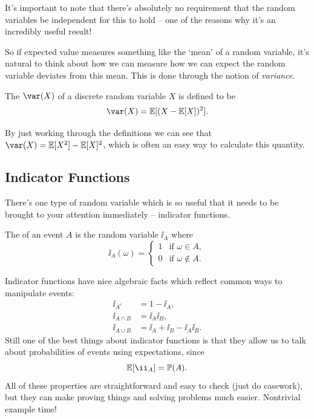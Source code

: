 \documentclass[a4paper]{scrartcl}
\begin{document}
It's important to note that there's absolutely no requirement that the random variables be independent for this to hold -- one of the reasons why it's an incredibly useful result!

So if expected value measures something like the `mean' of a random variable, it's natural to think about how we can measure how we can expect the random variable deviates from this mean. This is done through the notion of \emph{variance}.

\begin{definition}[Variance]
	The  $\var(X)$ of a discrete random variable $X$ is defined to be
	$$
\var(X) = \EE[(X - \EE[X])^2].
	$$
\end{definition}

By just working through the definitions we can see that $\var(X) = \EE[X^2] - \EE[X]^2$, which is often an easy way to calculate this quantity.

\subsection{Indicator Functions}

There's one type of random variable which is so useful that it needs to be brought to your attention immediately -- indicator functions.

\begin{definition}
	The  of an event $A$ is the random variable $\ii_A$ where
	$$
\ii_A(\omega) = \begin{cases}
	1 &\mbox{if } \omega  \in A, \\
	0 &\mbox{if } \omega  \not \in A.
   \end{cases}
	$$
\end{definition}

Indicator functions have nice algebraic facts which reflect common ways to manipulate events:
\begin{align*}
	\ii_{A^c} &= 1 - \ii_A, \\
	\ii_{A \cap B} &= \ii_A \ii_B, \\
	\ii_{A \cup B} &= \ii_A + \ii_B - \ii_A \ii_B.
\end{align*}
Still one of the best things about indicator functions is that they allow us to talk about probabilities of events using expectations, since
$$
\EE[\ii_A]= \PP(A).
$$
All of these properties are straightforward and easy to check (just do casework), but they can make proving things and solving problems much easier. Nontrivial example time!
\end{document}
